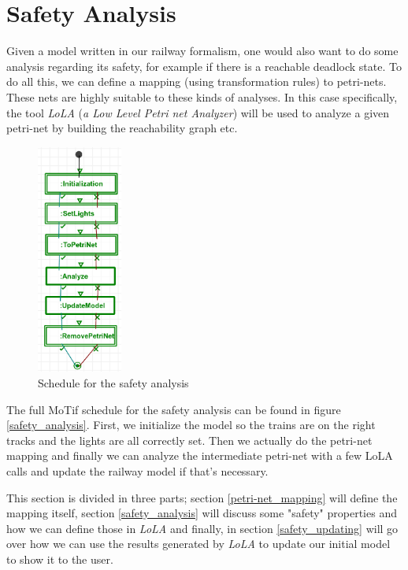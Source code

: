\documentclass{article}
\begin{document}
\section{Safety Analysis}

Given a model written in our railway formalism, one would also want to do some analysis regarding its safety, for example if there is a reachable deadlock state. To do all this, we can define a mapping (using transformation rules) to petri-nets. These nets are highly suitable to these kinds of analyses. In this case specifically, the tool \textit{LoLA} (\textit{a Low Level Petri net Analyzer}) \cite{lola} will be used to analyze a given petri-net by building the reachability graph etc.

\begin{figure}[H]
    \centering
    \includegraphics[width=0.25\textwidth]{images/analyze.png}
    \caption{Schedule for the safety analysis}
    \label{schedule_safety}
\end{figure}

The full MoTif schedule for the safety analysis can be found in figure \ref{safety_analysis}. First, we initialize the model so the trains are on the right tracks and the lights are all correctly set. Then we actually do the petri-net mapping and finally we can analyze the intermediate petri-net with a few LoLA calls and update the railway model if that's necessary.

This section is divided in three parts; section \ref{petri-net_mapping} will define the mapping itself, section \ref{safety_analysis} will discuss some "safety" properties and how we can define those in \textit{LoLA} and finally, in section \ref{safety_updating} will go over how we can use the results generated by \textit{LoLA} to update our initial model to show it to the user.
\end{document}
